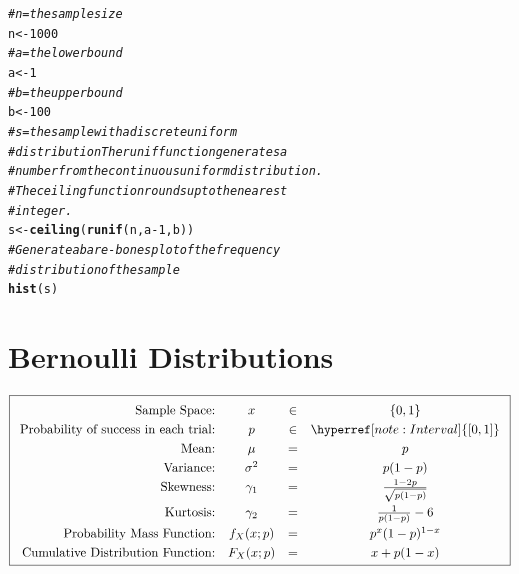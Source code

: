 \documentclass[nohyper,justified,marginals=raggedright]{tufte-book}\usepackage[]{graphicx}\usepackage[]{color}
\makeatletter
\newcommand{\hlnum}[1]{\textcolor[rgb]{0.686,0.059,0.569}{#1}}%
\newcommand{\hlcom}[1]{\textcolor[rgb]{0.678,0.584,0.686}{\textit{#1}}}%
\newcommand{\hlopt}[1]{\textcolor[rgb]{0,0,0}{#1}}%
\newcommand{\hlstd}[1]{\textcolor[rgb]{0.345,0.345,0.345}{#1}}%
\newcommand{\hlkwb}[1]{\textcolor[rgb]{0.69,0.353,0.396}{#1}}%
\newcommand{\hlkwd}[1]{\textcolor[rgb]{0.737,0.353,0.396}{\textbf{#1}}}%
\newenvironment{kframe}{%
 \def\at@end@of@kframe{}%
 \ifinner\ifhmode%
  \def\at@end@of@kframe{\end{minipage}}%
  \begin{minipage}{\columnwidth}%
 \fi\fi%
 \def\FrameCommand##1{\hskip\@totalleftmargin \hskip-\fboxsep
 \colorbox{shadecolor}{##1}\hskip-\fboxsep
     \hskip-\linewidth \hskip-\@totalleftmargin \hskip\columnwidth}%
 \MakeFramed {\advance\hsize-\width
   \@totalleftmargin\z@ \linewidth\hsize
   \@setminipage}}%
 {\par\unskip\endMakeFramed%
 \at@end@of@kframe}
\newenvironment{knitrout}{}{} %
\makeatother
\begin{document}
\begin{knitrout}
\color{fgcolor}\begin{kframe}
\begin{alltt}
\hlcom{# n = the sample size}
\hlstd{n} \hlkwb{<-} \hlnum{1000}
\hlcom{# a = the lower bound}
\hlstd{a} \hlkwb{<-} \hlnum{1}
\hlcom{# b = the upper bound}
\hlstd{b} \hlkwb{<-} \hlnum{100}
\hlcom{# s = the sample with a discrete uniform}
\hlcom{# distribution The runif function generates a}
\hlcom{# number from the continuous uniform distribution.}
\hlcom{# The ceiling function rounds up to the nearest}
\hlcom{# integer.}
\hlstd{s} \hlkwb{<-} \hlkwd{ceiling}\hlstd{(}\hlkwd{runif}\hlstd{(n, a} \hlopt{-} \hlnum{1}\hlstd{, b))}
\hlcom{# Generate a bare-bones plot of the frequency}
\hlcom{# distribution of the sample}
\hlkwd{hist}\hlstd{(s)}
\end{alltt}
\end{kframe}
\end{knitrout}

\section{Bernoulli Distributions}\label{sec:BernoulliDist}

\begin{equation*}
\boxed{
\setlength{\extrarowheight}{3pt}
\begin{array}{rccc}
\text{Sample Space:} & x&\in&\{0,1\}\\ 
\text{Probability of success in each trial:}  &p&\in&\hyperref [note:Interval]{[0,1]} \\
\text{Mean:} & \mu&=&p \\
\text{Variance:} & \sigma^2&=&p(1-p) \\
\text{Skewness:} & \gamma_1&=&\frac{1-2p}{\sqrt{p(1-p)}} \\
\text{Kurtosis:} & \gamma_2&=&\frac{1}{p(1-p)}-6 \\
\text{Probability Mass Function:} & f_X(x;p)&=&p^x(1-p)^{1-x} \\
\text{Cumulative Distribution Function:} & F_X(x;p)&=&x+p(1-x) \\
\end{array}
}
\end{equation*}
\end{document}
